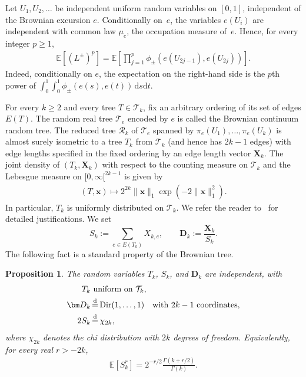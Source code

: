 \documentclass[english,11pt]{smfart}
\newcommand{\Ex}[1]{\mathbb{E}[#1]}
\newcommand{\Exb}[1]{\mathbb{E}\left[#1\right]}
\newcommand{\eqdist}{\,{\buildrel \mathrm{d} \over =}\,}
\newcommand{\cR}{\mathcal{R}}
\newcommand{\cT}{\mathcal{T}}
\newtheorem{proposition}[theorem]{Proposition}
\numberwithin{equation}{section}
\begin{document}
Let $U_1,U_2,\ldots$ be independent uniform random variables on $[0,1]$,
independent of the Brownian excursion $e$. Conditionally on~$e$, the variables $e(U_i)$ are independent with common law $\mu_e$, the occupation measure of~$e$. Hence, for every integer $p \ge 1$,
\begin{align}
	\label{eq:lpmp}
	\Ex{(L^\pm)^p} = \Exb{ \prod_{j=1}^p \phi_\pm(e(U_{2j-1}), e(U_{2j}))}.
\end{align}
Indeed, conditionally on $e$, the expectation on the right-hand side is the
$p$th power of $\int_0^1 \int_0^1 \phi_{\pm}(e(s),e(t))\,\mathrm{d}s\mathrm{d}t$.

For every $k \ge 2$ and every tree $T \in \cT_k$, fix an arbitrary ordering of its set of edges $E(T)$. The random real tree $\cT_e$ encoded by $e$ is called  the Brownian continuum random tree. The reduced tree $\cR_k$ of $\cT_e$ spanned by $\pi_e(U_1), \ldots, \pi_e(U_k)$ is almost surely isometric to a tree $T_k$ from $\cT_k$ (and hence has $2k-1$ edges) with edge lengths specified in the fixed ordering by an edge length vector $\bm{X}_k$. The joint density of $(T_k, \bm{X}_k)$ with respect to the counting  measure on $\cT_k$ and the Lebesgue measure on $[0, \infty[^{2k-1}$ is given by
\begin{align}
	\label{eq:d1}
	(T,\bm{x}) \mapsto  2^{2k} \|\bm{x}\|_1 \exp(-2\|\bm{x}\|_1^2).
\end{align}
In particular, $T_k$ is uniformly distributed on $\cT_k$. We refer the reader to~\cite[Sec. 4.3]{MR1207226} for detailed justifications. We set
\[
	S_k := \sum_{e\in E(T_k)}X_{k,e}, \qquad \bm{D}_k:=\frac{\bm X_k}{S_k}.
\]
The following fact is a standard property of the Brownian tree.
\begin{proposition}
	\label{pro:standard}
	The random variables $T_k$, $S_k$, and $\bm{D}_k$ are independent, with
	\begin{align*}
		T_k&\text{ uniform on }\cT_k,\\
		\bm D_k&\eqdist\mathrm{Dir}(1,\ldots,1)
		\quad\text{with }2k-1\text{ coordinates},\\
		2S_k&\eqdist \chi_{2k},
	\end{align*}
	where $\chi_{2k}$ denotes the chi distribution with $2k$ degrees of
	freedom. Equivalently, for every real $r>-2k$,
	\begin{align*}
		\Ex{S_k^r} = 2^{-r/2}\frac{\Gamma(k+r/2)}{\Gamma(k)}.
	\end{align*}
\end{proposition}
\end{document}
